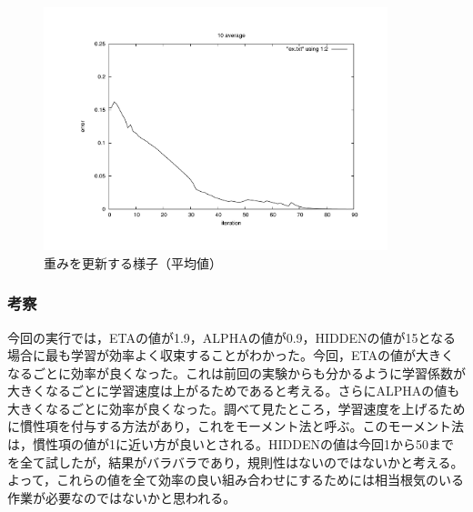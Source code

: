 \begin{figure}[h]
 \begin{center}
  \includegraphics[width=10.0cm,angle=-90]{figs/level2/ave1.pdf}
  \caption{重みを更新する様子（平均値）}
  \label{fig:level2}
 \end{center}
\end{figure}


\subsubsection{考察}
今回の実行では，ETAの値が1.9，ALPHAの値が0.9，HIDDENの値が15となる場合に最も学習が効率よく収束することがわかった。今回，ETAの値が大きくなるごとに効率が良くなった。これは前回の実験からも分かるように学習係数が大きくなるごとに学習速度は上がるためであると考える。さらにALPHAの値も大きくなるごとに効率が良くなった。調べて見たところ，学習速度を上げるために慣性項を付与する方法があり，これをモーメント法と呼ぶ。このモーメント法は，慣性項の値が1に近い方が良いとされる。HIDDENの値は今回1から50までを全て試したが，結果がバラバラであり，規則性はないのではないかと考える。よって，これらの値を全て効率の良い組み合わせにするためには相当根気のいる作業が必要なのではないかと思われる。


